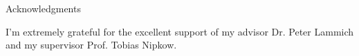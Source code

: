 \thispagestyle{empty}

\vspace*{20mm}

\begin{center}
{ Acknowledgments}
\end{center}

\vspace{10mm}

\noindent I’m extremely grateful for the excellent support of my advisor Dr. Peter Lammich and my supervisor Prof. Tobias Nipkow.

\cleardoublepage{}
